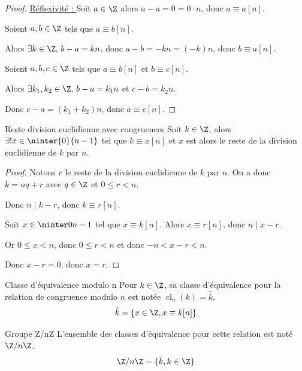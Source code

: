 \begin{proof}
    \uline{Réflexivité : }
    Soit $a \in \Z$ alors $a - a = 0 = 0 \cdot n$, donc $a \equiv a [n]$.

    Soient $a, b \in \Z$ tels que $a \equiv b [n]$.

    \svspace Alors $\exists k \in \Z, \, b - a = kn$, donc $a - b = -kn = (-k)n$, donc $b \equiv a [n]$.

     Soient $a, b, c \in \Z$ tels que $a \equiv b [n]$ et $b \equiv c [n]$.

    \svspace Alors $\exists k_1, k_2 \in \Z, \, b - a = k_1 n$ et $c - b = k_2 n$.

    Donc $c - a = (k_1 + k_2)n$, donc $a \equiv c [n]$.

\end{proof}

\begin{proposition}{Reste division euclidienne avec congruences}{}
    Soit $k \in \Z$, alors $\exists ! x \in \ninter{0}{n-1}$ tel que $k \equiv x [n]$ 
    et $x$ est alors le reste de la division euclidienne de $k$ par $n$.
\end{proposition}


\begin{proof}
    Notons $r$ le reste de la division euclidienne de $k$ par $n$. 
    On a donc $k = nq + r$ avec $q \in \Z$ et $0 \leqslant r < n$.
    
    Donc $n \mid k - r$, donc $k \equiv r [n]$.

    \avspace Soit $x \in \ninter 0 {n-1}$ tel que $x \equiv k [n]$.
    Alors $x \equiv r [n]$, donc $n \mid x - r$.

    Or $0 \leqslant x < n$, donc $0 \leqslant r < n$
    et donc $-n < x - r < n$.

    Donc $x - r = 0$, donc $x = r$.
\end{proof}

\begin{definition}{Classe d'équivalence modulo n}{}
    Pour $k \in \Z$, sa classe d'équivalence pour la relation de congruence modulo $n$ 
    est notée $\operatorname{cl}_n(k) = \hat k$. 
    $$\hat k = \{x \in \Z, x \equiv k [n]\}$$
\end{definition}

\begin{definition}{Groupe Z/nZ}{}
    L'ensemble des classes d'équivalence pour cette relation est noté $\Z/n\Z$.
    $$\Z/n\Z = \{\hat k, k \in \Z\}$$
\end{definition}

